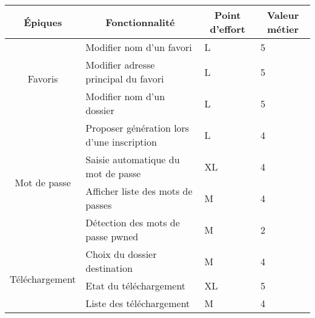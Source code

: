 \documentclass[10pt,a4paper]{article}
\begin{document}
\begin{table}[h]
\begin{tabular}{|c|l|l|l|}
\hline
\textbf{Épiques}            & \multicolumn{1}{c|}{\textbf{Fonctionnalité}} & \multicolumn{1}{c|}{\textbf{Point d'effort}} & \multicolumn{1}{c|}{\textbf{Valeur métier}} \\ \hline
\multirow{3}{*}{Favoris} & Modifier nom d'un favori                     & L                                            & 5 \\ \cline{2-4} 
                         & Modifier adresse principal du favori         & L                                            & 5                                           \\ \cline{2-4} 
                         & Modifier nom d'un dossier                    & L                                            & 5                                           \\ \hline
\multirow{4}{*}{Mot de passe}           & Proposer génération lors d'une inscription   & L                                            & 4                                          \\ \cline{2-4} 
                                        & Saisie automatique du mot de passe           & XL                                           & 4                                           \\ \cline{2-4} 
                                        & Afficher liste des mots de passes            & M                                            & 4                                           \\ \cline{2-4} 
                                        & Détection des mots de passe pwned            & M                                            & 2                                           \\ \hline
\multirow{3}{*}{Téléchargement}         & Choix du dossier destination                 & M                                            & 4                                           \\ \cline{2-4} 
                                        & Etat du téléchargement                       & XL                                           & 5                                           \\ \cline{2-4} 
                                        & Liste des téléchargement                     & M                                            & 4                                           \\ \hline
\end{tabular}
\end{table}
\end{document}
